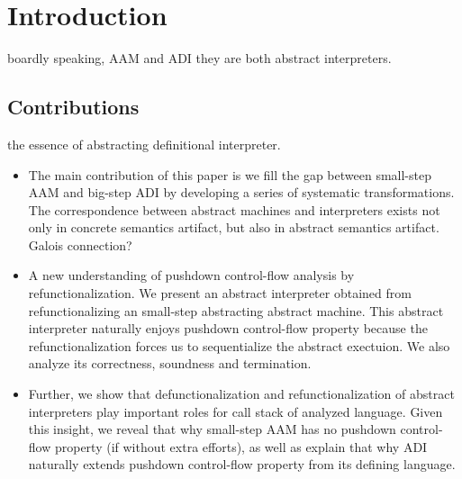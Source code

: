 \documentclass[acmsmall,review,anonymous]{acmart}\settopmatter{printfolios=true,printccs=false,printacmref=false}
\begin{document}




\maketitle

\section{Introduction}

boardly speaking, AAM and ADI they are both abstract interpreters.

\subsection{Contributions}

the essence of abstracting definitional interpreter.

\begin{itemize}
\item The main contribution of this paper is we fill the gap
  between small-step AAM and big-step ADI by developing a series of
  systematic transformations. 
  The correspondence between abstract
  machines and interpreters exists not only in concrete semantics artifact,
  but also in abstract semantics artifact.
  Galois connection?

\item A new understanding of pushdown control-flow analysis by 
  refunctionalization.
  We present an abstract interpreter obtained from refunctionalizing
  an small-step abstracting abstract machine. 
  This abstract interpreter naturally enjoys pushdown control-flow property
  because the refunctionalization forces us to sequentialize the 
  abstract exectuion.
  We also analyze its correctness, soundness and termination.

\item Further, we show that defunctionalization and refunctionalization
  of abstract interpreters play important roles for call stack of analyzed language.
  Given this insight, we reveal that why small-step AAM has no pushdown
  control-flow property (if without extra efforts), as well as explain
  that why ADI naturally extends pushdown control-flow property from its
  defining language.

\end{itemize}
\end{document}
